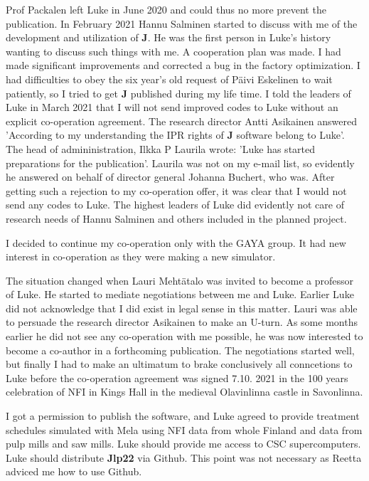 Prof Packalen left Luke in June 2020 and could thus no
more prevent the publication.
In February 2021 Hannu Salminen started to discuss
with me of the development and utilization of \textbf{J}.
He was the first person in Luke's
history wanting to discuss such things with me.
A cooperation plan was made.
I had made significant improvements and corrected a bug in the factory
optimization. I had difficulties to obey the six year's old request of P\"aivi Eskelinen to
wait patiently, so I tried
to get \textbf{J} published during my life time.
I told the leaders of Luke in March 2021 that I will not send improved codes
to Luke without an explicit co-operation agreement.
The research director Antti Asikainen answered
'According to my understanding the IPR rights of \textbf{J} software belong to Luke'.
The head of admininistration,
Ilkka P Laurila wrote: 'Luke has started preparations for the publication'.
Laurila was not on my e-mail list,
so evidently he answered on behalf of director general Johanna Buchert, who was.
After getting such a rejection to my co-operation offer, it was clear that
I would not send any codes to Luke. The highest leaders of Luke
did evidently not care of research needs of Hannu Salminen and others
included in the planned project.

I decided to continue my co-operation only with the GAYA group.
It had new interest
in co-operation as they were making a new simulator.



The situation changed when Lauri Meht\"atalo was invited to become a professor of Luke.
He started to mediate
negotiations between me and Luke. Earlier Luke did not acknowledge that I
did exist in legal sense in this matter. Lauri was able to persuade the
research director Asikainen to make an U-turn.
As some months earlier he did not see any co-operation with me possible,
he was now interested to become
a co-author in a forthcoming publication.
The negotiations started well, but finally I had to make an ultimatum to
brake conclusively all conncetions to Luke before
the co-operation agreement was signed 7.10. 2021 in the 100 years celebration of NFI in  Kings Hall
in the medieval Olavinlinna castle in Savonlinna.

I got a
permission to publish the software, and Luke agreed to
provide  treatment schedules simulated with Mela using NFI data from whole Finland and data
from pulp mills and saw mills.
Luke should provide me access to CSC supercomputers.  Luke should distribute \textbf{Jlp22} via Github.  This point
was not necessary as Reetta adviced me how to use Github.


